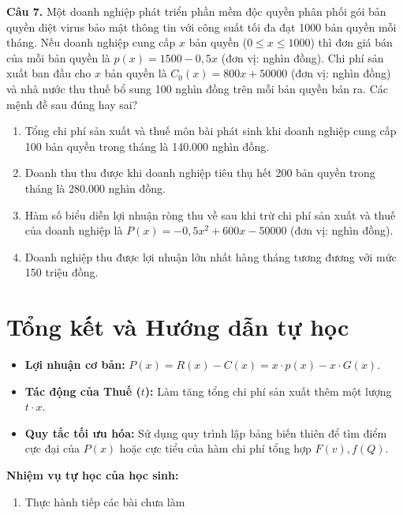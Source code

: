 \documentclass[12pt]{article}
\begin{document}
	\vspace{0.6cm}
	\noindent \textbf{Câu 7.} Một doanh nghiệp phát triển phần mềm độc quyền phân phối gói bản quyền diệt virus bảo mật thông tin với công suất tối đa đạt 1000 bản quyền mỗi tháng. Nếu doanh nghiệp cung cấp $x$ bản quyền ($0 \le x \le 1000$) thì đơn giá bán của mỗi bản quyền là $p(x) = 1500 - 0,5x$ (đơn vị: nghìn đồng). Chi phí sản xuất ban đầu cho $x$ bản quyền là $C_0(x) = 800x + 50000$ (đơn vị: nghìn đồng) và nhà nước thu thuế bổ sung 100 nghìn đồng trên mỗi bản quyền bán ra. Các mệnh đề sau đúng hay sai?
	\begin{enumerate}[label=\textbf{\alph*)}]
		\item Tổng chi phí sản xuất và thuế môn bài phát sinh khi doanh nghiệp cung cấp 100 bản quyền trong tháng là 140.000 nghìn đồng. \hfill  
		\item Doanh thu thu được khi doanh nghiệp tiêu thụ hết 200 bản quyền trong tháng là 280.000 nghìn đồng. \hfill  
		\item Hàm số biểu diễn lợi nhuận ròng thu về sau khi trừ chi phí sản xuất và thuế của doanh nghiệp là $P(x) = -0,5x^2 + 600x - 50000$ (đơn vị: nghìn đồng). \hfill  
		\item Doanh nghiệp thu được lợi nhuận lớn nhất hàng tháng tương đương với mức 150 triệu đồng. \hfill  
	\end{enumerate}
	\newpage
	
	\section{Tổng kết và Hướng dẫn tự học}
	
	\begin{tcolorbox}[colback=orange!10!white, colframe=orange!80!black,
		fonttitle=\bfseries, title={Tóm tắt công thức cốt lõi}]
		\begin{itemize}
			\item \textbf{Lợi nhuận cơ bản:} $P(x) = R(x) - C(x) = x \cdot p(x) - x \cdot G(x)$.
			\item \textbf{Tác động của Thuế ($t$):} Làm tăng tổng chi phí sản xuất thêm một lượng $t \cdot x$.
			\item \textbf{Quy tắc tối ưu hóa:} Sử dụng quy trình lập bảng biến thiên để tìm điểm cực đại của $P(x)$ hoặc cực tiểu của hàm chi phí tổng hợp $F(v), f(Q)$.
		\end{itemize}
	\end{tcolorbox}
	
	\vspace{5mm}
	\textbf{Nhiệm vụ tự học của học sinh:}
	\begin{enumerate}
		\item Thực hành tiếp các bài chưa làm
	\end{enumerate}
	
\end{document}

